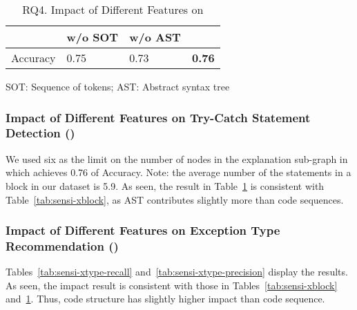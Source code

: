 \begin{table}[t]
  \caption{RQ4. Impact of Different Features on {\xstate}}
  \vspace{-12pt}
  \small
	\begin{center}
		\renewcommand{\arraystretch}{1}
		\begin{tabular}{p{1.75cm}<{\centering}|p{1.75cm}<{\centering}|p{1.75cm}<{\centering}|p{1.75cm}<{\centering}}
			\hline
			  & \tool w/o SOT & \tool w/o AST & \tool \\
			\hline
			Accuracy    & 0.75 & 0.73 & \textbf{0.76} \\
			\hline
		\end{tabular}
		SOT: Sequence of tokens; AST: Abstract syntax tree
		\label{tab:sensi-xstate}
	\end{center}
\end{table}

\subsubsection{Impact of Different Features on Try-Catch Statement Detection ({\xstate})}

We used six as the limit on the number of nodes in the explanation
sub-graph in which {\tool} achieves 0.76 of Accuracy. Note: the
average number of the statements in a  block in our
dataset is 5.9. As seen, the result in Table~\ref{tab:sensi-xstate} is
consistent with Table~\ref{tab:sensi-xblock}, as AST contributes
slightly more than code sequences.


\subsubsection{Impact of Different Features on Exception Type Recommendation ({\xtype})}

Tables~\ref{tab:sensi-xtype-recall}
and~\ref{tab:sensi-xtype-precision} display the results. As seen, the
impact result is consistent with those in
Tables~\ref{tab:sensi-xblock} and~\ref{tab:sensi-xstate}.
Thus, code structure has slightly higher impact than code sequence.

